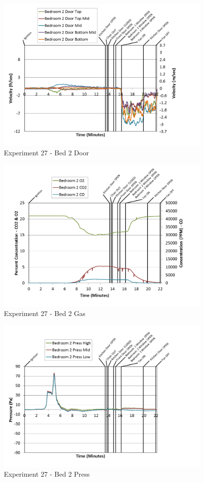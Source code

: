 \documentclass{article}
\begin{document}
\begin{appendices}
\clearpage

\begin{figure}[h!]
	\centering
	\includegraphics[height=3.05in]{0_Images/Results_Charts/Exp_27_Charts/Bed2Door.png}
	\caption{Experiment 27 - Bed 2 Door}
\end{figure}


\begin{figure}[h!]
	\centering
	\includegraphics[height=3.05in]{0_Images/Results_Charts/Exp_27_Charts/Bed2Gas.png}
	\caption{Experiment 27 - Bed 2 Gas}
\end{figure}

\clearpage

\begin{figure}[h!]
	\centering
	\includegraphics[height=3.05in]{0_Images/Results_Charts/Exp_27_Charts/Bed2Press.png}
	\caption{Experiment 27 - Bed 2 Press}
\end{figure}



\end{appendices}
\end{document}
